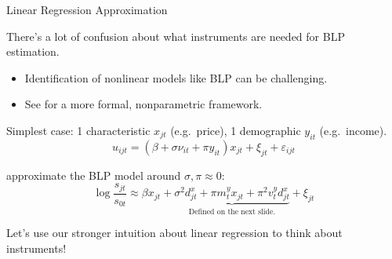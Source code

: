 \documentclass[aspectratio=169,t,11pt,table]{beamer}
\begin{document}
\begin{frame}{Linear Regression Approximation}
    \begin{wideitemize}
        \item There's a lot of confusion about what instruments are needed for BLP estimation.
        \begin{itemize}
            \item Identification of nonlinear models like BLP can be challenging.
            \item See \cite{berry2014identification,berry2024nonparametric} for a more formal, nonparametric framework.
        \end{itemize}
        \pause
        \item Simplest case: 1 characteristic $x_{jt}$ (e.g.\ price), 1 demographic $y_{it}$ (e.g.\ income).
        \begin{equation*}
            u_{ijt} = (\beta + \sigma \nu_{it} + \pi y_{it}) x_{jt} + \xi_{jt} + \varepsilon_{ijt} 
        \end{equation*}
        \vspace{-1.5\baselineskip}
        \pause
        \item \cite{salanie2022fast} approximate the BLP model around $\sigma, \pi \approx 0$:
        \begin{equation*}
            \log\frac{s_{jt}}{s_{0t}} \approx \beta x_{jt} + \underbrace{\sigma^2 d_{jt}^x + \pi m_t^y x_{jt} + \pi^2 v_t^y d_{jt}^x}_{\text{Defined on the next slide.}} + \xi_{jt}
        \end{equation*}
        \vspace{-1.5\baselineskip}
        \pause
        \item Let's use our stronger intuition about linear regression to think about instruments!
    \end{wideitemize}
\end{frame}
\end{document}
